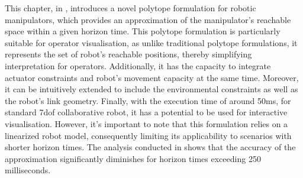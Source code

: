 This chapter, in , introduces a novel polytope formulation for robotic manipulators, which provides an approximation of the manipulator's reachable space within a given horizon time. This polytope formulation is particularly suitable for operator visualisation, as unlike traditional polytope formulations, it represents the set of robot's reachable positions, thereby simplifying interpretation for operators. Additionally, it has the capacity to integrate actuator constraints and robot's movement capacity at the same time. Moreover, it can be intuitively extended to include the environmental constraints as well as the robot's link geometry. Finally, with the execution time of around 50ms, for standard 7dof collaborative robot, it has a potential to be used for interactive visualisation. 
However, it's important to note that this formulation relies on a linearized robot model, consequently limiting its applicability to scenarios with shorter horizon times. The analysis conducted in  shows that the accuracy of the approximation significantly diminishes for horizon times exceeding 250 milliseconds. 



